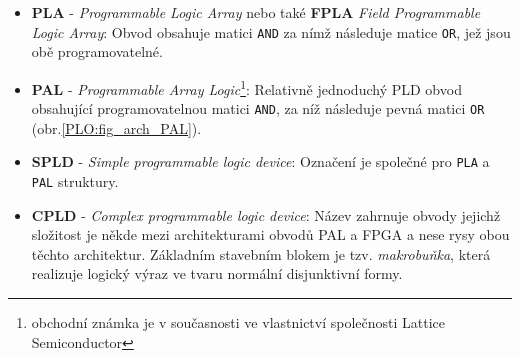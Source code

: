       \begin{itemize}
        \item \textbf{PLA} - \emph{Programmable Logic Array} nebo také \textbf{FPLA} \emph{Field
              Programmable Logic Array}: Obvod obsahuje matici \texttt{AND} za nímž následuje matice
              \texttt{OR}, jež jsou obě programovatelné.
        \item \textbf{PAL} - \emph{Programmable Array Logic}\footnote{obchodní známka je v
              současnosti ve vlastnictví společnosti Lattice Semiconductor}: Relativně jednoduchý
              PLD obvod obsahující programovatelnou matici \texttt{AND}, za níž následuje pevná
              matici \texttt{OR} (obr.\ref{PLO:fig_arch_PAL}). %
        \item \textbf{SPLD} - \emph{Simple programmable logic device}: Označení je společné pro   
              \texttt{PLA} a \texttt{PAL} struktury.
        \item \textbf{CPLD} - \emph{Complex programmable logic device}: Název zahrnuje obvody   
              jejichž složitost je někde mezi architekturami obvodů PAL a FPGA a nese rysy obou 
              těchto architektur. Základním stavebním blokem je tzv. \emph{makrobuňka}, která 
              realizuje logický výraz ve tvaru normální disjunktivní formy.   

\end{itemize}
